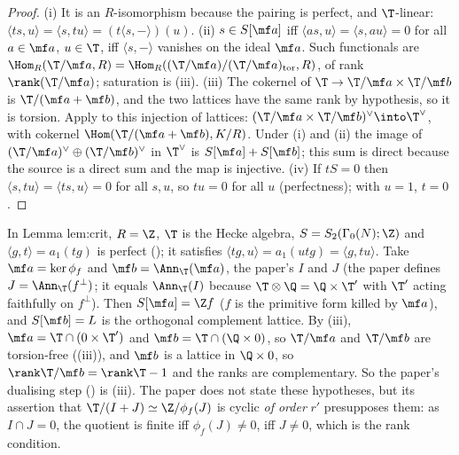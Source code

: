 \begin{proof}
(i) It is an $R$-isomorphism because the pairing is perfect, and $\T$-linear: $\langle ts,u\rangle=\langle s,tu\rangle=(t\langle s,-\rangle)(u)$.
(ii) $s\in S[\mf a]$ iff $\langle as,u\rangle=\langle s,au\rangle=0$ for all $a\in\mf a$, $u\in\T$, iff $\langle s,-\rangle$ vanishes on the ideal $\mf a$. Such functionals are
$\Hom_R(\T/\mf a,R)=\Hom_R((\T/\mf a)/(\T/\mf a)_{\mathrm{tor}},R)$, of rank $\rank(\T/\mf a)$; saturation is (iii).
(iii) The cokernel of $\T\to\T/\mf a\times\T/\mf b$ is $\T/(\mf a+\mf b)$, and the two lattices have the same rank by hypothesis, so it is torsion. Apply
 to this injection of lattices: $(\T/\mf a\times\T/\mf b)^\vee\into\T^\vee$, with cokernel $\Hom(\T/(\mf a+\mf b),K/R)$. Under (i)
and (ii) the image of $(\T/\mf a)^\vee\oplus(\T/\mf b)^\vee$ in $\T^\vee$ is $S[\mf a]+S[\mf b]$; this sum is direct because the source is a direct sum and the map is injective.
(iv) If $tS=0$ then $\langle s,tu\rangle=\langle ts,u\rangle=0$ for all $s,u$, so $tu=0$ for all $u$ (perfectness); with $u=1$, $t=0$.
\end{proof}

\begin{paperlink}\label{pl:modules:algebra-duality}
In Lemma lem:crit, $R=\Z$, $\T$ is the Hecke algebra, $S=S_2(\Gamma_0(N);\Z)$ and $\langle g,t\rangle=a_1(tg)$ is perfect (); it satisfies
$\langle tg,u\rangle=a_1(utg)=\langle g,tu\rangle$. Take $\mf a=\ker\phi_f$ and $\mf b=\Ann_\T(\mf a)$, the paper's $I$ and $J$ (the paper defines $J=\Ann_\T(f^\perp)$; it equals
$\Ann_\T(I)$ because $\T\otimes\Q=\Q\times\T'$ with $\T'$ acting faithfully on $f^\perp$). Then $S[\mf a]=\Z f$ ($f$ is the primitive form killed by $\mf a$), and
$S[\mf b]=L$ is the orthogonal complement lattice. By (iii), $\mf a=\T\cap(0\times\T')$ and $\mf b=\T\cap(\Q\times0)$, so
$\T/\mf a$ and $\T/\mf b$ are torsion-free ((iii)), and $\mf b$ is a lattice in $\Q\times0$, so $\rank\T/\mf b=\rank\T-1$ and the
ranks are complementary. So the paper's dualising step () is (iii). The paper does not state these hypotheses, but its assertion that
$\T/(I+J)\simeq\Z/\phi_f(J)$ is cyclic \emph{of order} $r'$ presupposes them: as $I\cap J=0$, the quotient is finite iff $\phi_f(J)\ne0$, iff $J\ne0$, which is
the rank condition.
\end{paperlink}

